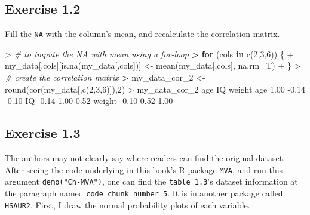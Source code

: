 \documentclass[
]{article}
\newenvironment{Shaded}{\begin{snugshade}}{\end{snugshade}}
\newcommand{\AttributeTok}[1]{\textcolor[rgb]{0.77,0.63,0.00}{#1}}
\newcommand{\CommentTok}[1]{\textcolor[rgb]{0.56,0.35,0.01}{\textit{#1}}}
\newcommand{\ControlFlowTok}[1]{\textcolor[rgb]{0.13,0.29,0.53}{\textbf{#1}}}
\newcommand{\DecValTok}[1]{\textcolor[rgb]{0.00,0.00,0.81}{#1}}
\newcommand{\ErrorTok}[1]{\textcolor[rgb]{0.64,0.00,0.00}{\textbf{#1}}}
\newcommand{\FloatTok}[1]{\textcolor[rgb]{0.00,0.00,0.81}{#1}}
\newcommand{\FunctionTok}[1]{\textcolor[rgb]{0.00,0.00,0.00}{#1}}
\newcommand{\NormalTok}[1]{#1}
\newcommand{\OtherTok}[1]{\textcolor[rgb]{0.56,0.35,0.01}{#1}}
\newcommand{\SpecialCharTok}[1]{\textcolor[rgb]{0.00,0.00,0.00}{#1}}
\begin{document}
\hypertarget{exercise-1.2}{%
\subsection{Exercise 1.2}\label{exercise-1.2}}

Fill the \texttt{NA} with the column's mean, and recalculate the
correlation matrix.

\begin{Shaded}
\begin{Highlighting}[]
\SpecialCharTok{\textgreater{}} \CommentTok{\# to impute the NA with mean using a for{-}loop}
\ErrorTok{\textgreater{}} \ControlFlowTok{for}\NormalTok{ (cols }\ControlFlowTok{in} \FunctionTok{c}\NormalTok{(}\DecValTok{2}\NormalTok{,}\DecValTok{3}\NormalTok{,}\DecValTok{6}\NormalTok{)) \{}
\SpecialCharTok{+}\NormalTok{   my\_data[,cols][}\FunctionTok{is.na}\NormalTok{(my\_data[,cols])] }\OtherTok{\textless{}{-}} \FunctionTok{mean}\NormalTok{(my\_data[,cols], }\AttributeTok{na.rm=}\NormalTok{T)}
\SpecialCharTok{+}\NormalTok{ \}}
\SpecialCharTok{\textgreater{}} \CommentTok{\# create the correlation matrix}
\ErrorTok{\textgreater{}}\NormalTok{ my\_data\_cor\_2 }\OtherTok{\textless{}{-}} \FunctionTok{round}\NormalTok{(}\FunctionTok{cor}\NormalTok{(my\_data[,}\FunctionTok{c}\NormalTok{(}\DecValTok{2}\NormalTok{,}\DecValTok{3}\NormalTok{,}\DecValTok{6}\NormalTok{)]),}\DecValTok{2}\NormalTok{)}
\SpecialCharTok{\textgreater{}}\NormalTok{ my\_data\_cor\_2 }
\NormalTok{         age    IQ weight}
\NormalTok{age     }\FloatTok{1.00} \SpecialCharTok{{-}}\FloatTok{0.14}  \SpecialCharTok{{-}}\FloatTok{0.10}
\NormalTok{IQ     }\SpecialCharTok{{-}}\FloatTok{0.14}  \FloatTok{1.00}   \FloatTok{0.52}
\NormalTok{weight }\SpecialCharTok{{-}}\FloatTok{0.10}  \FloatTok{0.52}   \FloatTok{1.00}
\end{Highlighting}
\end{Shaded}

\hypertarget{exercise-1.3}{%
\subsection{Exercise 1.3}\label{exercise-1.3}}

The authors may not clearly say where readers can find the original
dataset. After seeing the code underlying in this book's R package
\texttt{MVA}, and run this argument \texttt{demo("Ch-MVA")}, one can
find the \texttt{table\ 1.3}'s dataset information at the paragraph
named \texttt{code\ chunk\ number\ 5}. It is in another package called
\texttt{HSAUR2}. First, I draw the normal probability plots of each
variable.
\end{document}
